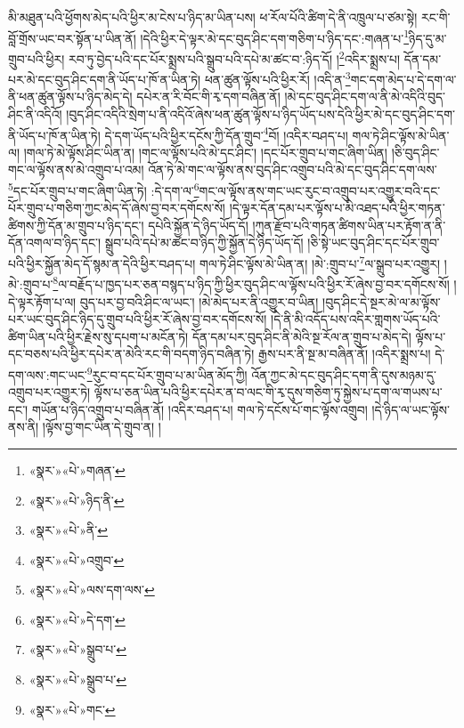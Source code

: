 མི་མཐུན་པའི་ཕྱོགས་མེད་པའི་ཕྱིར་མ་ངེས་པ་ཉིད་མ་ཡིན་པས། ཕ་རོལ་པོའི་ཚིག་དེ་ནི་འཁྲུལ་པ་ཙམ་སྟེ། རང་གི་བློ་གྲོས་ཡང་བར་སྟོན་པ་ཡིན་ནོ། །དེའི་ཕྱིར་དེ་ལྟར་མེ་དང་བུད་ཤིང་དག་གཅིག་པ་ཉིད་དང་:གཞན་པ་\footnote{«སྣར་»«པེ་»གཞན་}ཉིད་དུ་མ་གྲུབ་པའི་ཕྱིར། རབ་ཏུ་བྱེད་པའི་དང་པོར་སྨྲས་པའི་སྒྲུབ་པའི་དཔེ་མ་ཚང་བ་:ཉིད་དོ། །\footnote{«སྣར་»«པེ་»ཉིད་ནི་}འདིར་སྨྲས་པ། དོན་དམ་པར་མེ་དང་བུད་ཤིང་དག་ནི་ཡོད་པ་ཁོ་ན་ཡིན་ཏེ། ཕན་ཚུན་ལྟོས་པའི་ཕྱིར་རོ། །འདི་ན་\footnote{«སྣར་»«པེ་»ནི་}གང་དག་མེད་པ་དེ་དག་ལ་ནི་ཕན་ཚུན་ལྟོས་པ་ཉིད་མེད་དེ། དཔེར་ན་རི་བོང་གི་རྭ་དག་བཞིན་ནོ། །མེ་དང་བུད་ཤིང་དག་ལ་ནི་མེ་འདིའི་བུད་ཤིང་ནི་འདིའོ། །བུད་ཤིང་འདིའི་སྲེག་པ་ནི་འདིའོ་ཞེས་ཕན་ཚུན་ལྟོས་པ་ཉིད་ཡོད་པས་དེའི་ཕྱིར་མེ་དང་བུད་ཤིང་དག་ནི་ཡོད་པ་ཁོ་ན་ཡིན་ཏེ། དེ་དག་ཡོད་པའི་ཕྱིར་དངོས་ཀྱི་དོན་གྲུབ་\footnote{«སྣར་»«པེ་»འགྲུབ་}བོ། །འདིར་བཤད་པ། གལ་ཏེ་ཤིང་ལྟོས་མེ་ཡིན་ལ། །གལ་ཏེ་མེ་ལྟོས་ཤིང་ཡིན་ན། །གང་ལ་ལྟོས་པའི་མེ་དང་ཤིང་། །དང་པོར་གྲུབ་པ་གང་ཞིག་ཡིན། །ཅི་བུད་ཤིང་གང་ལ་ལྟོས་ནས་མེ་འགྲུབ་པ་འམ། འོན་ཏེ་མེ་གང་ལ་ལྟོས་ནས་བུད་ཤིང་འགྲུབ་པའི་མེ་དང་བུད་ཤིང་དག་ལས་\footnote{«སྣར་»«པེ་»ལས་དག་ལས་}དང་པོར་གྲུབ་པ་གང་ཞིག་ཡིན་ཏེ། :དེ་དག་ལ་\footnote{«སྣར་»«པེ་»དེ་དག་}གང་ལ་ལྟོས་ནས་གང་ཡང་རུང་བ་འགྲུབ་པར་འགྱུར་བའི་དང་པོར་གྲུབ་པ་གཅིག་ཀྱང་མེད་དོ་ཞེས་བྱ་བར་དགོངས་སོ། །དེ་ལྟར་དོན་དམ་པར་ལྟོས་པ་མི་འཐད་པའི་ཕྱིར་གཏན་ཚིགས་ཀྱི་དོན་མ་གྲུབ་པ་ཉིད་དང་། དཔེའི་སྐྱོན་དེ་ཉིད་ཡོད་དོ། །ཀུན་རྫོབ་པའི་གཏན་ཚིགས་ཡིན་པར་རྟོག་ན་ནི་དོན་འགལ་བ་ཉིད་དང་། སྒྲུབ་པའི་དཔེ་མ་ཚང་བ་ཉིད་ཀྱི་སྐྱོན་དེ་ཉིད་ཡོད་དོ། །ཅི་སྟེ་ཡང་བུད་ཤིང་དང་པོར་གྲུབ་པའི་ཕྱིར་སྐྱོན་མེད་དོ་སྙམ་ན་དེའི་ཕྱིར་བཤད་པ། གལ་ཏེ་ཤིང་ལྟོས་མེ་ཡིན་ན། །མེ་:གྲུབ་པ་\footnote{«སྣར་»«པེ་»སྒྲུབ་པ་}ལ་སྒྲུབ་པར་འགྱུར། །མེ་:གྲུབ་པ་\footnote{«སྣར་»«པེ་»སྒྲུབ་པ་}ལ་བརྗོད་པ་ཁྱད་པར་ཅན་བསྙད་པ་ཉིད་ཀྱི་ཕྱིར་བུད་ཤིང་ལ་ལྟོས་པའི་ཕྱིར་རོ་ཞེས་བྱ་བར་དགོངས་སོ། །དེ་ལྟར་རྟོག་པ་ལ། བུད་པར་བྱ་བའི་ཤིང་ལ་ཡང་། །མེ་མེད་པར་ནི་འགྱུར་བ་ཡིན། །བུད་ཤིང་དེ་སྔར་མེ་ལ་མ་ལྟོས་པར་ཡང་བུད་ཤིང་ཉིད་དུ་གྲུབ་པའི་ཕྱིར་རོ་ཞེས་བྱ་བར་དགོངས་སོ། །དེ་ནི་མི་འདོད་པས་འདིར་གླགས་ཡོད་པའི་ཚིག་ཡིན་པའི་ཕྱིར་རྗེས་སུ་དཔག་པ་མངོན་ཏེ། དོན་དམ་པར་བུད་ཤིང་ནི་མེའི་སྔ་རོལ་ན་གྲུབ་པ་མེད་དེ། ལྟོས་པ་དང་བཅས་པའི་ཕྱིར་དཔེར་ན་མེའི་རང་གི་བདག་ཉིད་བཞིན་ཏེ། རྒྱས་པར་ནི་སྔ་མ་བཞིན་ནོ། །འདིར་སྨྲས་པ། དེ་དག་ལས་:གང་ཡང་\footnote{«སྣར་»«པེ་»གང་}རུང་བ་དང་པོར་གྲུབ་པ་མ་ཡིན་མོད་ཀྱི། འོན་ཀྱང་མེ་དང་བུད་ཤིང་དག་ནི་དུས་མཉམ་དུ་འགྲུབ་པར་འགྱུར་ཏེ། ལྟོས་པ་ཅན་ཡིན་པའི་ཕྱིར་དཔེར་ན་བ་ལང་གི་རྭ་དུས་གཅིག་ཏུ་སྐྱེས་པ་དག་ལ་གཡས་པ་དང་། གཡོན་པ་ཉིད་འགྲུབ་པ་བཞིན་ནོ། །འདིར་བཤད་པ། གལ་ཏེ་དངོས་པོ་གང་ལྟོས་འགྲུབ། །དེ་ཉིད་ལ་ཡང་ལྟོས་ནས་ནི། །ལྟོས་བྱ་གང་ཡིན་དེ་གྲུབ་ན། །
